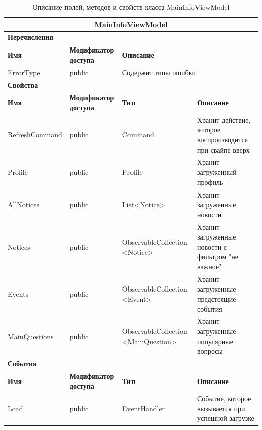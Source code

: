 \documentclass{../includes/TechDoc}
\begin{document}
    \newpage

    \begin{table}[ht]
        \caption{\label{tab:class-maininfoviewmodel-table}Описание полей, методов и свойств класса MainInfoViewModel}
        \centering
        \begin{tabular}{|p{3.2cm}|p{3cm}|p{3.8cm}|p{3cm}|p{3cm}|}
            \hline
            \multicolumn{5}{|c|}{MainInfoViewModel} \\ \hline
            \multicolumn{5}{|l|}{\textbf{Перечисления}} \\ \hline
            \textbf{Имя} & \textbf{Модификатор доступа} & \multicolumn{3}{p{5cm}|}{\textbf{Описание}} \\ \hline
            ErrorType & public & \multicolumn{3}{l|}{Содержит типы ошибки} \\ \hline
            \multicolumn{5}{|l|}{\textbf{Свойства}} \\ \hline
            \textbf{Имя} & \textbf{Модификатор доступа} & \textbf{Тип} & \multicolumn{2}{p{6.8cm}|}{\textbf{Описание}} \\ \hline
            RefreshCommand & public & Command & \multicolumn{2}{p{6.8cm}|}{Хранит действие, которое воспроизводится при свайпе вверх} \\ \hline
            Profile & public & Profile & \multicolumn{2}{p{6.8cm}|}{Хранит загруженный профиль} \\ \hline
            AllNotices & public & List<Notice> & \multicolumn{2}{p{6.8cm}|}{Хранит загруженные новости} \\ \hline
            Notices & public & ObservableCollection <Notice> & \multicolumn{2}{p{6.8cm}|}{Хранит загруженные новости с фильтром "не важное"} \\ \hline
            Events & public & ObservableCollection <Event> & \multicolumn{2}{p{6.8cm}|}{Хранит загруженные предстоящие события} \\ \hline
            MainQuestions & public & ObservableCollection <MainQuestion> & \multicolumn{2}{p{6.8cm}|}{Хранит загруженные популярные вопросы} \\ \hline
            \multicolumn{5}{|l|}{\textbf{События}} \\ \hline
            \textbf{Имя} & \textbf{Модификатор доступа} & \textbf{Тип} & \multicolumn{2}{p{6.8cm}|}{\textbf{Описание}} \\ \hline
            Load & public & EventHandler & \multicolumn{2}{p{6.8cm}|}{Событие, которое вызывается при успешной загрузке} \\ \hline

\end{tabular}
\end{table}
\end{document}
